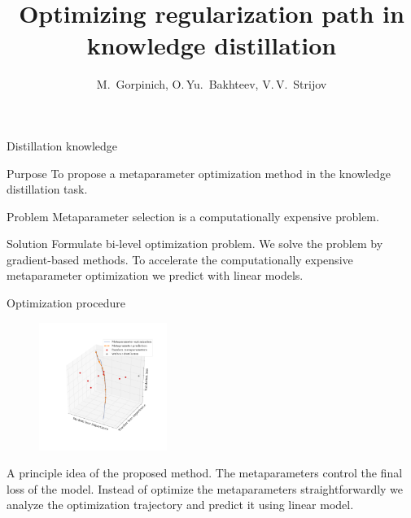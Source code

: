 \documentclass[12pt, aspectratio=169]{beamer}
\title[\hbox to 56mm{Optimizing regularization path in knowledge distillation}]{Optimizing regularization path in knowledge distillation}
\author[M.~Gorpinich, O.\,Yu.~Bakhteev, V.\,V.~Strijov]{M.~Gorpinich, O.\,Yu.~Bakhteev, V.\,V.~Strijov}
\institute{\fontsize{11}{14}\selectfont Moscow Institute of Physics and Technology}
\date{\footnotesize
\par\bigskip\small 2021}
\begin{document}
\begin{frame}
\thispagestyle{empty}
\maketitle
\end{frame}

\begin{frame}{Distillation knowledge}
\begin{block}{Purpose}
    To propose a metaparameter optimization method in the knowledge distillation task.
\end{block}
\begin{block}{Problem}
    Metaparameter selection is a computationally expensive problem.
\end{block}
\begin{block}{Solution}
    Formulate bi-level optimization problem. We solve the problem by gradient-based methods. To accelerate the computationally expensive metaparameter optimization we predict with linear models.
\end{block}
\end{frame}

\begin{frame}{Optimization procedure}
    \begin{figure}
    \caption*{}
    \vspace{-1.26 cm}
    \includegraphics[width=0.37\textwidth]{trajectory_.pdf}
\end{figure}

A principle idea of the proposed method. The metaparameters control the final loss of the model. Instead of optimize the metaparameters straightforwardly we analyze the optimization trajectory and predict it using linear model.

\end{frame}
\end{document}

